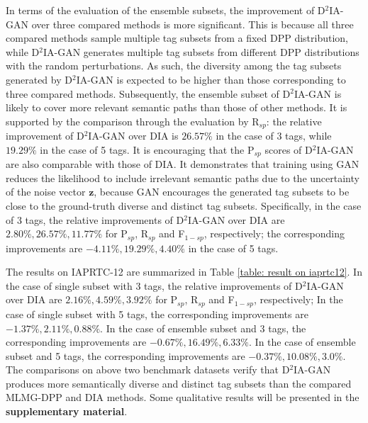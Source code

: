 \documentclass[10pt,twocolumn,letterpaper]{article}
\newcommand{\z}{\mathbf{z}}
\begin{document}
In terms of the evaluation of the ensemble subsets, the improvement of D$^2$IA-GAN over three compared methods is more significant. 
This is because all three compared methods sample multiple tag subsets from a fixed DPP distribution, while D$^2$IA-GAN generates multiple tag subsets from different DPP distributions with the random perturbations. 
As such, the diversity among the tag subsets generated by D$^2$IA-GAN is expected to be higher than those corresponding to three compared methods. 
Subsequently, the ensemble subset of D$^2$IA-GAN is likely to cover more relevant semantic paths than those of other methods.
It is supported by the comparison through the evaluation by R$_{sp}$: the relative improvement of D$^2$IA-GAN over DIA is $26.57\%$ in the case of 3 tags, while $19.29\%$ in the case of 5 tags. 
It is encouraging that the P$_{sp}$ scores of D$^2$IA-GAN are also comparable with those of DIA. It demonstrates that training using GAN reduces the likelihood to include irrelevant semantic paths due to the uncertainty of the noise vector $\z$, because GAN encourages the generated tag subsets to be close to the ground-truth diverse and distinct tag subsets. 
Specifically, in the case of 3 tags, the relative improvements of D$^2$IA-GAN over DIA are $2.80\%, 26.57\%, 11.77\%$ for P$_{sp}$, R$_{sp}$ and F$_{1-sp}$, respectively; the corresponding improvements are $-4.11\%, 19.29\%, 4.40\%$ in the case of 5 tags. 

The results on IAPRTC-12 are summarized in Table \ref{table: result on iaprtc12}. 
In the case of single subset with 3 tags, the relative improvements of D$^2$IA-GAN over DIA are $2.16\%, 4.59\%, 3.92\%$ for P$_{sp}$, R$_{sp}$ and F$_{1-sp}$, respectively; 
In the case of single subset with 5 tags, the corresponding improvements are $-1.37\%, 2.11\%, 0.88\%$.
In the case of ensemble subset and 3 tags, the corresponding improvements are $-0.67\%, 16.49\%, 6.33\%$. 
In the case of ensemble subset and 5 tags, the corresponding improvements are $-0.37\%, 10.08\%, 3.0\%$. 
The comparisons on above two benchmark datasets verify that D$^2$IA-GAN produces more semantically diverse and distinct tag subsets than the compared MLMG-DPP and DIA methods.  
Some qualitative results will be presented in the {\bf supplementary material}.
\end{document}
